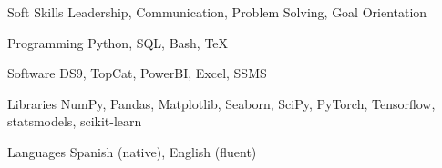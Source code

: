 
\begin{cvskills}

        \cvskill
        {Soft Skills}
    {Leadership, Communication, Problem Solving, Goal Orientation}

	\cvskill
	{Programming}
    {Python, SQL, Bash, \TeX}

        \cvskill
        {Software}
    {DS9, TopCat, PowerBI, Excel, SSMS}

	\cvskill
	{Libraries}
    {NumPy, Pandas, Matplotlib, Seaborn, SciPy, PyTorch, Tensorflow, statsmodels, scikit-learn}

        \cvskill
        {Languages}
    {Spanish (native), English (fluent)}
\end{cvskills}
